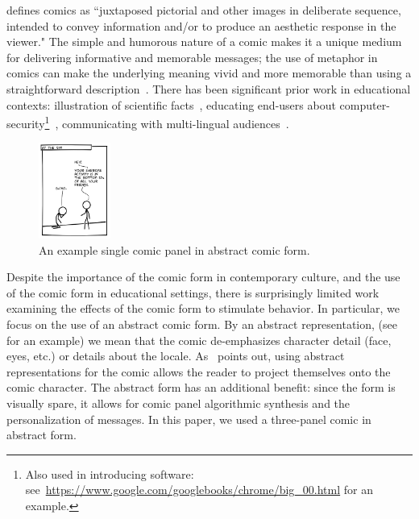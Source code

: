 \textcite{scott1993understanding} defines comics as ``juxtaposed pictorial and other images in deliberate sequence, intended to convey information and/or to produce an aesthetic response in the viewer."  The simple and humorous nature of a comic makes it a unique medium for delivering informative and memorable messages; the use of metaphor in comics can make the underlying meaning vivid and more memorable than using a straightforward description~\parencite{McDermottPB18,scott1993understanding}. There has been significant prior work in educational contexts: illustration of scientific facts~\parencite{McDermottPB18}, educating end-users about computer-security\footnote{Also used in introducing software: see~\url{https://www.google.com/googlebooks/chrome/big_00.html} for an example.}~\parencite{Zhang-Kennedy:2017:SCI:3206217.3206282}, communicating with multi-lingual audiences~\parencite{cary2004going, miguel2005ethnic}. 

\begin{figure}
    \centering
    \includegraphics[width=0.21\textwidth]{figures/intro_new.png}
  \vspace{-10pt}
  \caption{An example single comic panel in abstract comic form.} \label{fig:intro}
  \vspace{-10pt}
\end{figure}

Despite the importance of the comic form in contemporary culture, and the use of the comic form in educational settings, there is surprisingly limited work examining the effects of the comic form to stimulate behavior. In particular, we focus on the use of an abstract comic form. By an abstract representation, (see~ for an example) we mean that the comic de-emphasizes character detail (face, eyes, etc.) or details about the locale. As~\textcite{scott1993understanding} points out, using abstract representations for the comic allows the reader to project themselves onto the comic character. The abstract form has an additional benefit: since the form is visually spare, it allows for comic panel algorithmic synthesis and the personalization of messages. In this paper, we used a three-panel comic in abstract form.

